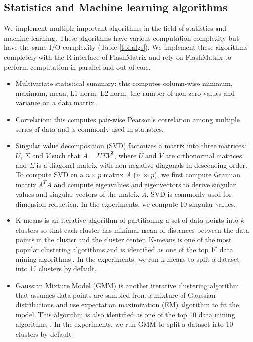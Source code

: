 \subsection{Statistics and Machine learning algorithms} \label{sec:apps}
We implement multiple important algorithms in the field of statistics and
machine learning. These algorithms have various computation complexity but
have the same I/O complexity (Table \ref{tbl:algs}). We implement these
algorithms completely with the R interface of FlashMatrix and
rely on FlashMatrix to perform computation in parallel and out of core.
\begin{itemize}
	\item Multivariate statistical summary: this computes column-wise minimum,
		maximum, mean, L1 norm, L2 norm, the number of non-zero values and
		variance on a data matrix.
	\item Correlation: this computes pair-wise Pearson's correlation \cite{cor}
		among multiple series of data and is commonly used in statistics.
	\item Singular value decomposition (SVD) factorizes a matrix into
		three matrices: $U$, $\Sigma$ and $V$ such that $A=U \Sigma V^T$, where
		$U$ and $V$ are orthonormal matrices and $\Sigma$ is a diagonal
		matrix with non-negative diagonals in descending order. To compute SVD
		on a $n \times p$ matrix $A$ ($n \gg p$), we first compute Gramian
		matrix $A^T A$ and compute eigenvalues and eigenvectors to derive singular
		values and singular vectors of the matrix $A$. SVD is commonly
		used for dimension reduction. In the experiments, we compute 10 singular
		values.
	\item K-means \cite{kmeans} is an iterative algorithm of partitioning a set
		of data points into $k$ clusters so that each cluster has minimal mean
		of distances between the data points in the cluster and the cluster
		center. K-means
		is one of the most popular clustering algorithms and is identified as
		one of the top 10 data mining algorithms \cite{top10}. In the experiments,
		we run k-means to split a dataset into 10 clusters by default.
	\item Gaussian Mixture Model (GMM) \cite{gmm} is another iterative clustering
		algorithm that assumes data points are sampled from a mixture of
		Gaussian distributions and use expectation maximization (EM) \cite{gmm}
		algorithm to fit the model. This algorithm is also identified as one
		of the top 10 data mining algorithms \cite{top10}. In the experiments,
		we run GMM to split a dataset into 10 clusters by default.
\end{itemize}

